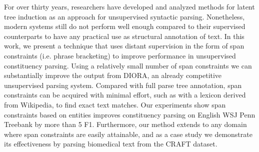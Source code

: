 For over thirty years, researchers have developed and analyzed methods for latent tree induction as an approach for unsupervised syntactic parsing. Nonetheless, modern systems still do not perform well enough compared to their supervised counterparts to have any practical use as structural annotation of text. In this work, we present a technique that uses distant supervision in the form of span constraints (i.e. phrase bracketing) to improve performance in unsupervised constituency parsing. Using a relatively small number of span constraints we can substantially improve the output from DIORA, an already competitive unsupervised parsing system. Compared with full parse tree annotation, span constraints can be acquired with minimal effort, such as with a lexicon derived from Wikipedia, to find exact text matches. Our experiments show span constraints based on entities improves constituency parsing on English WSJ Penn Treebank by more than 5 F1. Furthermore, our method extends to any domain where span constraints are easily attainable, and as a case study we demonstrate its effectiveness by parsing biomedical text from the CRAFT dataset.
